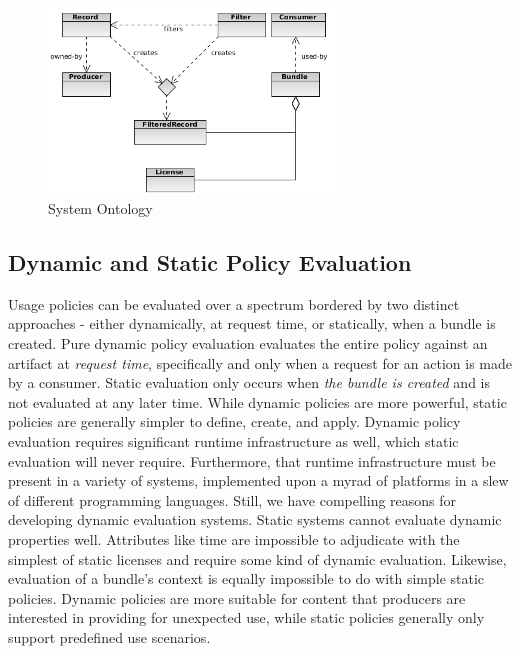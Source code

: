 \documentclass[10pt, conference, compsocconf]{IEEEtran}
\begin{document}
\begin{figure}[!t]
\centering
\includegraphics[width=3in]{ontology}
\caption{System Ontology}
\label{System Ontology}
\end{figure}

\subsection{Dynamic and Static Policy Evaluation}
Usage policies can be evaluated over a spectrum bordered by two distinct approaches - either dynamically, at request time, or statically, when a bundle is created.  Pure dynamic policy evaluation evaluates the entire policy against an artifact at \textit{request time}, specifically and only when a request for an action is made by a consumer.  Static evaluation only occurs when \textit{the bundle is created} and is not evaluated at any later time.  While dynamic policies are more powerful, static policies are generally simpler to define, create, and apply.  Dynamic policy evaluation requires significant runtime infrastructure as well, which static evaluation will never require.  Furthermore, that runtime infrastructure must be present in a variety of systems, implemented upon a myrad of platforms in a slew of different programming languages.  Still, we have compelling reasons for developing dynamic evaluation systems.  Static systems cannot evaluate dynamic properties well.  Attributes like time are impossible to adjudicate with the simplest of static licenses and require some kind of dynamic evaluation.  Likewise, evaluation of a bundle's context is equally impossible to do with simple static policies.  Dynamic policies are more suitable for content that producers are interested in providing for unexpected use, while static policies generally only support predefined use scenarios.
\end{document}
